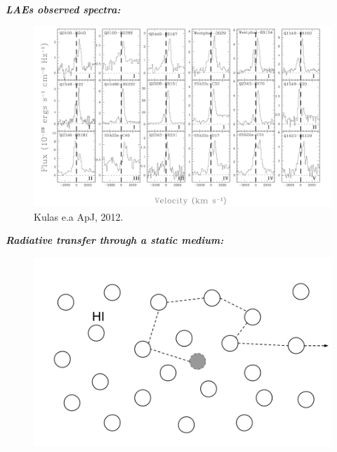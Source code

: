 \documentclass{beamer}
\begin{document}
\begin{frame}{\textit{\textbf{LAEs observed spectra:}}}
\begin{figure}
\includegraphics[scale=0.33]{Figures/kulas.png}
\caption*{Kulas e.a ApJ, 2012.}
\end{figure}
\end{frame}

\begin{frame}{\textit{\textbf{Radiative transfer through a static medium:}}}
\begin{figure}
\includegraphics[scale=0.3]{Figures/RT.png}
\end{figure}
\end{frame}
\end{document}
